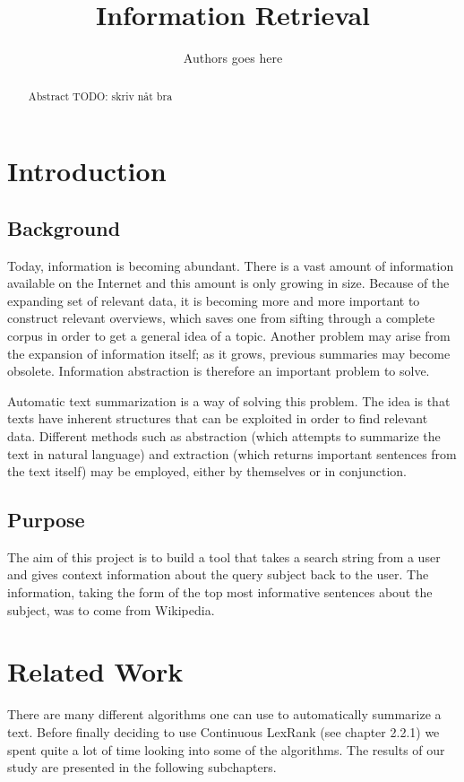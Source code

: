 \documentclass[10pt, a4paper]{article}
\title{Information Retrieval}
\author{Authors goes here}
\begin{document}
\maketitle
\begin{abstract}
Abstract
TODO: skriv nåt bra
\end{abstract}

\section{Introduction}
\subsection{Background}
Today, information is becoming abundant. There is a vast amount of information available on the Internet and this amount is only growing in size. Because of the expanding set of relevant data, it is becoming more and more important to construct relevant overviews, which saves one from sifting through a complete corpus in order to get a general idea of a topic. Another problem may arise from the expansion of information itself; as it grows, previous summaries may become obsolete. Information abstraction is therefore an important problem to solve.

Automatic text summarization is a way of solving this problem. The idea is that texts have inherent structures that can be exploited in order to find relevant data. Different methods such as abstraction (which attempts to summarize the text in natural language) and extraction (which returns important sentences from the text itself) may be employed, either by themselves or in conjunction.
\subsection{Purpose}
The aim of this project is to build a tool that takes a search string from a user and gives context information about the query subject back to the user. The information, taking the form of the top most informative sentences about the subject, was to come from Wikipedia. 

\section{Related Work}
There are many different algorithms one can use to automatically summarize a text. Before finally deciding to use Continuous LexRank (see chapter 2.2.1) we spent quite a lot of time looking into some of the algorithms. The results of our study are presented in the following subchapters.
\end{document}
